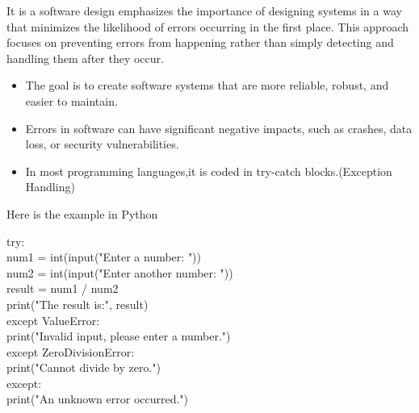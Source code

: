 %
%
%
%




\STANDARD{}
{ 
	
	It is a software design emphasizes the importance of designing systems in a way that minimizes the likelihood of errors occurring in the first place. This approach focuses on preventing errors from happening rather than simply detecting and handling them after they occur.\\
	
	\bigskip
	
	\begin{itemize}
		\item The goal is to create software systems that are more reliable, robust, and easier to maintain.
		\item Errors in software can have significant negative impacts, such as crashes, data loss, or security vulnerabilities.
		\item In most programming languages,it is coded in try-catch blocks.(Exception Handling)
	\end{itemize}
	
}
\begin{frame}
	\vspace{0.5cm}
	Here is the example in Python 
	
	\vspace{0.5cm}
	
	try:\\
	num1 = int(input("Enter a number: "))\\
	num2 = int(input("Enter another number: "))\\
	result = num1 / num2\\
	print("The result is:", result)\\
	except ValueError:\\
	print("Invalid input, please enter a number.")\\
	except ZeroDivisionError:\\
	print("Cannot divide by zero.")\\
	except:\\
	print("An unknown error occurred.")\\
	
\end{frame}
\STANDARD{}
